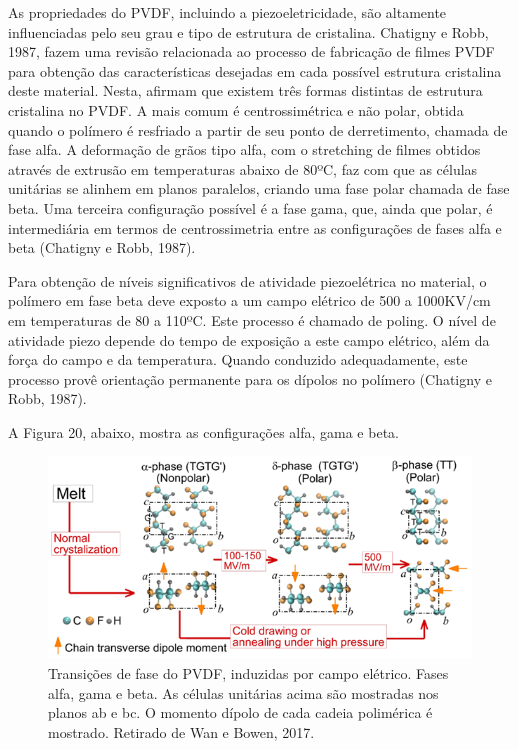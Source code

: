 \documentclass[
	12pt,				
	oneside,			
	a4paper,			
	english,			
	brazil				
	]{abntex2ppgsi}
\begin{document}
As propriedades do PVDF, incluindo a piezoeletricidade, são altamente influenciadas pelo seu grau e tipo de estrutura de cristalina. Chatigny e Robb, 1987, fazem uma revisão relacionada ao processo de fabricação de filmes PVDF para obtenção das características desejadas em cada possível estrutura cristalina deste material. Nesta, afirmam que existem três formas distintas de estrutura cristalina no PVDF. A mais comum é centrossimétrica e não polar, obtida quando o polímero é resfriado a partir de seu ponto de derretimento, chamada de fase alfa. A deformação de grãos tipo alfa, com o stretching de filmes obtidos através de extrusão em temperaturas abaixo de 80ºC, faz com que as células unitárias se alinhem em planos paralelos, criando uma fase polar chamada de fase beta. Uma terceira configuração possível é a fase gama, que, ainda que polar, é intermediária em termos de centrossimetria entre as configurações de fases alfa e beta (Chatigny e Robb, 1987).

Para obtenção de níveis significativos de atividade piezoelétrica no material, o polímero em fase beta deve exposto a um campo elétrico de 500 a 1000KV/cm em temperaturas de 80 a 110ºC. Este processo é chamado de poling. O nível de atividade piezo depende do tempo de exposição a este campo elétrico, além da força do campo e da temperatura. Quando conduzido adequadamente, este processo provê orientação permanente para os dípolos no polímero (Chatigny e Robb, 1987).

A Figura 20, abaixo, mostra as configurações alfa, gama e beta.

\begin{figure}[!htb]
\centering
\includegraphics{Figura20}
\caption {Transições de fase do PVDF, induzidas por campo elétrico. Fases alfa, gama e beta. As células unitárias acima são mostradas nos planos ab e bc. O momento dípolo de cada cadeia polimérica é mostrado. Retirado de Wan e Bowen, 2017.}
\label{Figura20}
\end{figure}
\end{document}
